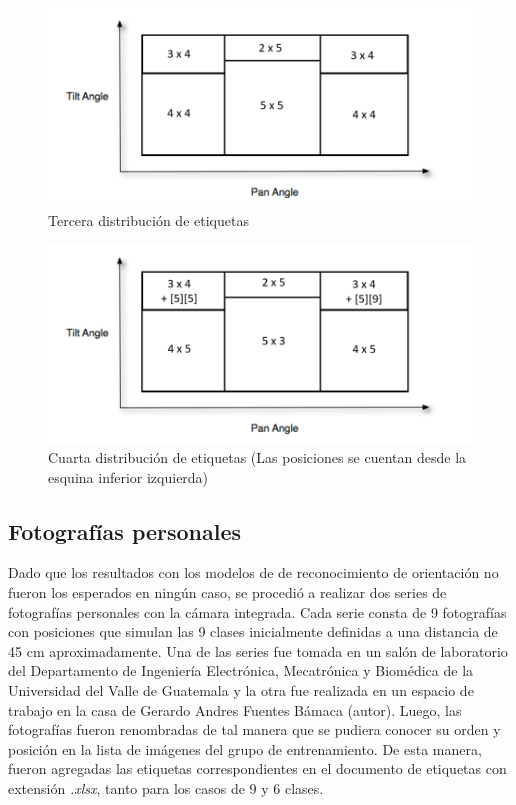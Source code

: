 \begin{figure}[H]
	\centering
	\includegraphics[scale=1]{figures/clasi2.png}
	\caption{Tercera distribución de etiquetas}
	\label{fig:img6}
\end{figure}

\begin{figure}[H]
	\centering
	\includegraphics[scale=1]{figures/clasi3.png}
	\caption{Cuarta distribución de etiquetas (Las posiciones se cuentan desde la esquina inferior izquierda)}
	\label{fig:img7}
\end{figure}


\subsection{Fotografías personales}
Dado que los resultados con los modelos de de reconocimiento de orientación no fueron los esperados en ningún caso, se procedió a realizar dos series de fotografías personales con la cámara integrada. Cada serie consta de 9 fotografías con posiciones que simulan las 9 clases inicialmente definidas a una distancia de 45 cm aproximadamente. Una de las series fue tomada en un salón de laboratorio del Departamento de Ingeniería Electrónica, Mecatrónica y Biomédica de la Universidad del Valle de Guatemala y la otra fue realizada en un espacio de trabajo en la casa de Gerardo Andres Fuentes Bámaca (autor). Luego, las fotografías fueron renombradas de tal manera que se pudiera conocer su orden y posición en la lista de imágenes del grupo de entrenamiento. De esta manera, fueron agregadas las etiquetas correspondientes en el documento de etiquetas con extensión \textit{.xlsx}, tanto para los casos de 9 y 6 clases.
